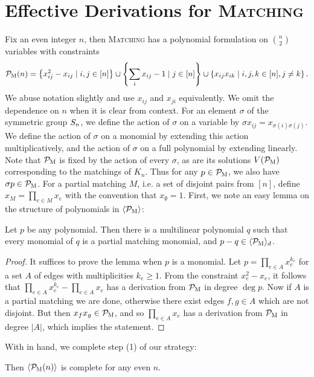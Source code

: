 \section{Effective Derivations for \textsc{Matching}}
Fix an even integer $n$, then \textsc{Matching} has a polynomial formulation on $\binom{n}{2}$ variables with constraints
\begin{align}
\mathcal P_{\textsc{M}}(n) = \left\{x_{ij}^2 - x_{ij} \mid i,j \in [n]\right\} \cup \left\{\sum_i x_{ij} - 1 \mid j \in [n]\right\} \cup \left\{x_{ij}x_{ik} \mid i,j,k \in [n], j\neq k\right\}.\label{eq:matching-formulation}
\end{align}
We abuse notation slightly and use $x_{ij}$ and $x_{ji}$ equivalently. We omit the dependence on $n$ when it is clear from context. For an element $\sigma$ of the symmetric group $S_{n}$, we define the action of $\sigma$ on a variable by $\sigma x_{ij} = x_{\sigma(i)\sigma(j)}$.
We define the action of $\sigma$ on a monomial by extending this action multiplicatively, and the action of $\sigma$ on a full polynomial by extending linearly.
Note that $\mathcal P_{\textsc{M}}$ is fixed by the action of every $\sigma$, as are its solutions $V(\mathcal P_{\textsc{M}})$ corresponding to the matchings of $K_n$. 
Thus for any $p \in \mathcal P_{\textsc{M}}$, we also have $\sigma p \in \mathcal P_{\textsc{M}}$. For a partial matching $M$, i.e. a set of disjoint pairs from $[n]$, define $x_M = \prod_{e \in M} x_e$ with the convention that $x_{\emptyset} = 1$.
First, we note an easy lemma on the structure of polynomials in $\langle \mathcal P_{\textsc{M}} \rangle$:
\begin{lemma}\label{lem:monomials}
  Let $p$ be any polynomial. Then there is a multilinear polynomial $q$ such that every monomial of $q$ is a partial matching monomial, and $p-q \in \langle \mathcal P_{\textsc{M}} \rangle_d$.
\end{lemma}
\begin{proof}
It suffices to prove the lemma when \(p\) is a monomial. Let
\(p = \prod_{e \in A} x_{e}^{k_{e}}\)
for a set \(A\) of edges with multiplicities \(k_{e} \geq 1\).
From the constraint \(x_{e}^{2} - x_e\), it follows that
$\prod_{e \in A} x_e^{k_e} - \prod_{e \in A} x_e$ has a derivation from $\mathcal P_{\textsc{M}}$ in degree $\deg p$.
Now if $A$ is a partial matching we are done, otherwise there exist edges $f,g \in A$ which are not disjoint.
But then $x_fx_g \in \mathcal P_{\textsc{M}}$, and so $\prod_{e \in A} x_e$ has a derivation from $\mathcal P_{\textsc{M}}$ in degree $|A|$, which implies the statement.
\end{proof}
With  in hand, we complete step (1) of our strategy:
\begin{lemma}\label{lem:matching-complete}
Then $\langle \mathcal P_{\textsc{M}}(n) \rangle$ is complete for any even $n$. 
\end{lemma}
